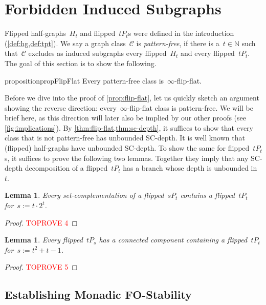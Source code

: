 \documentclass[11pt]{article}      \usepackage[margin=1in]{geometry}  \usepackage{microtype}
\newtheorem{lemma}[theorem]{Lemma}
\theoremstyle{definition}
\newcommand{\N}[0]{\mathrm{\mathbb{N}}}
\newcommand{\CC}{\mathcal{C}}
\begin{document}
 
\section{Forbidden Induced Subgraphs}\label{sec:subgraphs}

Flipped half-graphs~$H_t$ and flipped~$tP_t$s were defined in the introduction (\cref{def:hg,def:tpt}).
We say a graph class~$\CC$ is \emph{pattern-free}, if there is a~$t\in \N$ such that~$\CC$ excludes as induced subgraphs every flipped~$H_t$ and
every flipped~$tP_t$.
The goal of this section is to show the following.

\begin{restatable}{proposition}{propFlipFlat}
  \label{prop:flip-flat}
  Every pattern-free class is~$\infty$-flip-flat.
\end{restatable}

Before we dive into the proof of \cref{prop:flip-flat}, let us quickly sketch an argument showing the reverse direction: every~$\infty$-flip-flat class is pattern-free.
We will be brief here, as this direction will later also be implied by our other proofs (see \cref{fig:implications}).
By \cref{thm:flip-flat,thm:sc-depth}, it suffices to show that every class that is not pattern-free has unbounded SC-depth.
It is well known that (flipped) half-graphs have unbounded SC-depth.
To show the same for flipped~$tP_t$s,
it suffices to prove the following two lemmas. Together they imply that any SC-depth decomposition of a flipped~$tP_t$ has a branch whose depth is unbounded in~$t$.

\begin{lemma}
  Every set-complementation of a flipped~$sP_t$ contains a flipped~$tP_t$ for~$s := t \cdot 2^t$.
\end{lemma}
\begin{proof}\textcolor{red}{TOPROVE 4}\end{proof}

\begin{lemma}
  Every flipped~$tP_s$ has a connected component containing a flipped~$tP_t$ for~$s := t^2 + t - 1$.
\end{lemma}
\begin{proof}\textcolor{red}{TOPROVE 5}\end{proof}

\subsection{Establishing Monadic FO-Stability}
\end{document}
